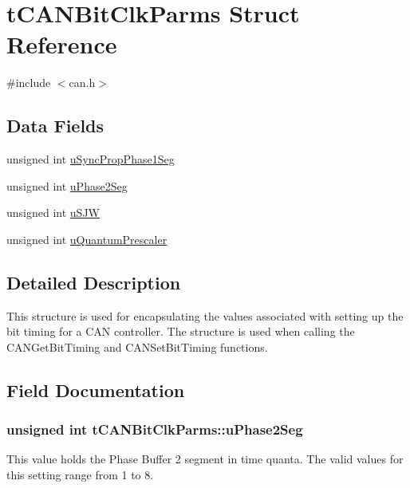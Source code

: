 \hypertarget{structtCANBitClkParms}{}\section{t\+C\+A\+N\+Bit\+Clk\+Parms Struct Reference}
\label{structtCANBitClkParms}


{\ttfamily \#include $<$can.\+h$>$}

\subsection*{Data Fields}
\begin{DoxyCompactItemize}
\item 
unsigned int \hyperlink{structtCANBitClkParms_aa99151a686e0a3725b0fd84810ab6d12}{u\+Sync\+Prop\+Phase1\+Seg}
\item 
unsigned int \hyperlink{structtCANBitClkParms_ad95f806349e583b53aaa912f0fada94d}{u\+Phase2\+Seg}
\item 
unsigned int \hyperlink{structtCANBitClkParms_af7d91d76a38a5fe4a2b814bb54db1348}{u\+S\+JW}
\item 
unsigned int \hyperlink{structtCANBitClkParms_a2d5f2674b68dfc7f3c47b6113951e41e}{u\+Quantum\+Prescaler}
\end{DoxyCompactItemize}


\subsection{Detailed Description}
This structure is used for encapsulating the values associated with setting up the bit timing for a C\+AN controller. The structure is used when calling the C\+A\+N\+Get\+Bit\+Timing and C\+A\+N\+Set\+Bit\+Timing functions. 

\subsection{Field Documentation}
\subsubsection[{\texorpdfstring{u\+Phase2\+Seg}{uPhase2Seg}}]{\setlength{\rightskip}{0pt plus 5cm}unsigned int t\+C\+A\+N\+Bit\+Clk\+Parms\+::u\+Phase2\+Seg}\hypertarget{structtCANBitClkParms_ad95f806349e583b53aaa912f0fada94d}{}\label{structtCANBitClkParms_ad95f806349e583b53aaa912f0fada94d}
This value holds the Phase Buffer 2 segment in time quanta. The valid values for this setting range from 1 to 8. 
